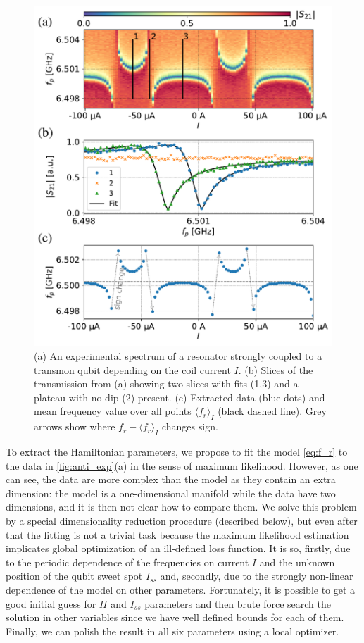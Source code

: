 \documentclass[%
 aip,
 draft,
 amsmath,amssymb,
 reprint,%
]{revtex4-1}
\begin{document}
\begin{figure}[h!]
\includegraphics[width=\linewidth]{anti_subplots}
\caption{(a) An experimental spectrum of a resonator strongly coupled to a transmon qubit depending on the coil current $I$. (b) Slices of the transmission from (a) showing two slices with fits (1,3) and a plateau with no dip (2) present. (c) Extracted data (blue dots) and mean frequency value over all points $\langle f_r \rangle_{I}$ (black dashed line). Grey arrows show where $f_r - \langle f_r \rangle_{I}$ changes sign.}
\label{fig:anti_exp}
\end{figure}

To extract the Hamiltonian parameters, we propose to fit the model \eqref{eq:f_r} to the data in \autoref{fig:anti_exp}(a) in the sense of maximum likelihood. However, as one can see, the data are more complex than the model as they contain an extra dimension: the model is a one-dimensional manifold while the data have two dimensions, and it is then not clear how to compare them. We solve this problem by a special dimensionality reduction procedure (described below), but even after that the fitting is not a trivial task because the maximum likelihood estimation implicates global optimization of an ill-defined loss function. It is so, firstly, due to the periodic dependence of the frequencies on current $I$ and the unknown position of the qubit sweet spot $I_{ss}$ and, secondly, due to the strongly non-linear dependence of the model on other parameters. Fortunately, it is possible to get a good initial guess for $\Pi$ and $I_{ss}$ parameters and then brute force search the solution in other variables since we have well defined bounds for each of them. Finally, we can polish the result in all six parameters using a local optimizer.
\end{document}
